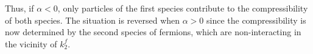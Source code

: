 \documentclass[aps,pra,
superscriptaddress,
reprint,twocolumn,preprintnumbers,
amsmath,amssymb,
nofootinbib]{revtex4-1}
\def\rf#1{(\ref{#1})}
\begin{document}
Thus, if $\alpha<0$, only particles of the first species contribute to the compressibility of both species. The situation is reversed when $\alpha>0$ since the compressibility is now determined by the second species of fermions, which are non-interacting in the vicinity of $k_2^f$. 


        
 
\end{document}
